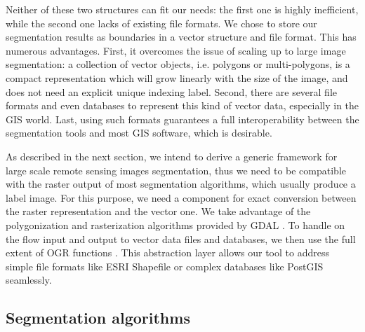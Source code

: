 \documentclass{josis}
\begin{document}
Neither of these two structures can fit our needs: the first one is
highly inefficient, while the second one lacks of existing file
formats. We chose to store our segmentation results as boundaries in a
vector structure and file format. This has numerous advantages. First,
it overcomes the issue of scaling up to large image segmentation: a
collection of vector objects, i.e. polygons or multi-polygons, is a
compact representation which will grow linearly with the size of the
image, and does not need an explicit unique indexing label. Second,
there are several file formats and even databases to represent this
kind of vector data, especially in the GIS world. Last, using such
formats guarantees a full interoperability between the segmentation
tools and most GIS software, which is desirable.

As described in the next section, we intend to derive a generic
framework for large scale remote sensing images segmentation, thus we
need to be compatible with the raster output of most segmentation
algorithms, which usually produce a label image. For this purpose, we
need a component for exact conversion between the raster
representation and the vector one. We take advantage of the
polygonization and rasterization algorithms provided by GDAL
\cite{}. To handle on the flow input and output to vector data files
and databases, we then use the full extent of OGR functions
\cite{}. This abstraction layer allows our tool to address
simple file formats like ESRI Shapefile or complex databases like
PostGIS seamlessly.

\subsection{Segmentation algorithms}
\end{document}
